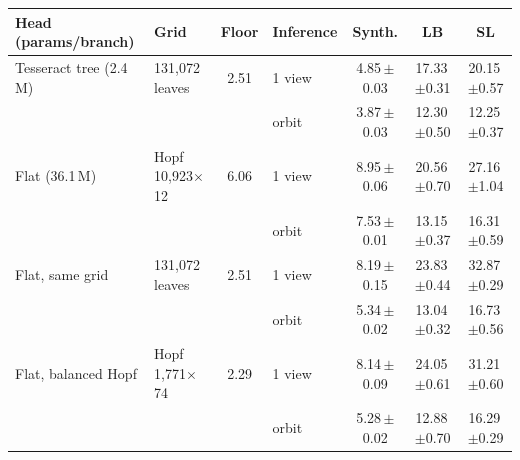 \begin{tabular}{@{}llc l ccc@{}}
\toprule
Head (params/branch) & Grid & Floor & Inference & Synth. & LB & SL \\
\midrule
Tesseract tree (2.4\,M) & 131,072 leaves & 2.51 & 1 view & 4.85\,{\scriptsize$\pm$0.03} & 17.33\,{\scriptsize$\pm$0.31} & 20.15\,{\scriptsize$\pm$0.57} \\
 & &  & orbit & 3.87\,{\scriptsize$\pm$0.03} & 12.30\,{\scriptsize$\pm$0.50} & 12.25\,{\scriptsize$\pm$0.37} \\
Flat (36.1\,M) & Hopf 10,923$\times$12 & 6.06 & 1 view & 8.95\,{\scriptsize$\pm$0.06} & 20.56\,{\scriptsize$\pm$0.70} & 27.16\,{\scriptsize$\pm$1.04} \\
 & &  & orbit & 7.53\,{\scriptsize$\pm$0.01} & 13.15\,{\scriptsize$\pm$0.37} & 16.31\,{\scriptsize$\pm$0.59} \\
Flat, same grid & 131,072 leaves & 2.51 & 1 view & 8.19\,{\scriptsize$\pm$0.15} & 23.83\,{\scriptsize$\pm$0.44} & 32.87\,{\scriptsize$\pm$0.29} \\
 & &  & orbit & 5.34\,{\scriptsize$\pm$0.02} & 13.04\,{\scriptsize$\pm$0.32} & 16.73\,{\scriptsize$\pm$0.56} \\
Flat, balanced Hopf & Hopf 1,771$\times$74 & 2.29 & 1 view & 8.14\,{\scriptsize$\pm$0.09} & 24.05\,{\scriptsize$\pm$0.61} & 31.21\,{\scriptsize$\pm$0.60} \\
 & &  & orbit & 5.28\,{\scriptsize$\pm$0.02} & 12.88\,{\scriptsize$\pm$0.70} & 16.29\,{\scriptsize$\pm$0.29} \\
\bottomrule
\end{tabular}